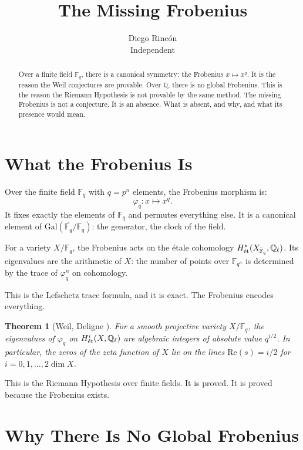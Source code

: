 \documentclass[12pt]{article}
\title{The Missing Frobenius}
\author{Diego Rinc\'on\\
\small Independent}
\date{}
\newtheorem{theorem}{Theorem}
\theoremstyle{definition}
\theoremstyle{remark}
\begin{document}
\maketitle

\begin{abstract}
Over a finite field $\mathbb{F}_q$,
there is a canonical symmetry: the Frobenius $x \mapsto x^q$.
It is the reason the Weil conjectures are provable.
Over $\mathbb{Q}$, there is no global Frobenius.
This is the reason the Riemann Hypothesis is not provable by the same method.
The missing Frobenius is not a conjecture. It is an absence.
What is absent, and why, and what its presence would mean.
\end{abstract}

\section{What the Frobenius Is}

Over the finite field $\mathbb{F}_q$ with $q = p^n$ elements,
the Frobenius morphism is:
$$\varphi_q : x \longmapsto x^q.$$
It fixes exactly the elements of $\mathbb{F}_q$
and permutes everything else.
It is a canonical element of $\mathrm{Gal}(\overline{\mathbb{F}_q}/\mathbb{F}_q)$:
the generator, the clock of the field.

For a variety $X/\mathbb{F}_q$,
the Frobenius acts on the \'etale cohomology $H^*_{\rm\acute{e}t}(X_{\bar{\mathbb{F}}_q}, \mathbb{Q}_\ell)$.
Its eigenvalues are the arithmetic of $X$:
the number of points over $\mathbb{F}_{q^n}$
is determined by the trace of $\varphi_q^n$ on cohomology.

This is the Lefschetz trace formula, and it is exact.
The Frobenius encodes everything.

\begin{theorem}[Weil, Deligne {\cite{deligne,weil}}]
For a smooth projective variety $X/\mathbb{F}_q$,
the eigenvalues of $\varphi_q$ on $H^i_{\rm\acute{e}t}(X, \mathbb{Q}_\ell)$
are algebraic integers of absolute value $q^{i/2}$.
In particular, the zeros of the zeta function of $X$
lie on the lines $\mathrm{Re}(s) = i/2$
for $i = 0, 1, \ldots, 2\dim X$.
\end{theorem}

This is the Riemann Hypothesis over finite fields.
It is proved.
It is proved because the Frobenius exists.

\section{Why There Is No Global Frobenius}
\end{document}
